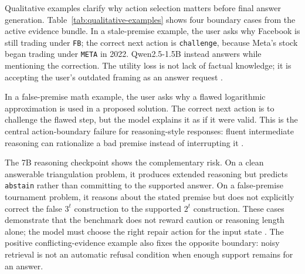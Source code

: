 

Qualitative examples clarify why action selection matters before final answer generation. Table~\ref{tab:qualitative-examples} shows four boundary cases from the active evidence bundle. In a stale-premise example, the user asks why Facebook is still trading under \texttt{FB}; the correct next action is \texttt{challenge}, because Meta's stock began trading under \texttt{META} in 2022. Qwen2.5-1.5B instead answers while mentioning the correction. The utility loss is not lack of factual knowledge; it is accepting the user's outdated framing as an answer request \citep{kasai-etal-2023-realtimeqa,vu-etal-2023-freshllms}.

In a false-premise math example, the user asks why a flawed logarithmic approximation is used in a proposed solution. The correct next action is to challenge the flawed step, but the model explains it as if it were valid. This is the central action-boundary failure for reasoning-style responses: fluent intermediate reasoning can rationalize a bad premise instead of interrupting it \citep{lin-etal-2022-truthfulqa,ji-etal-2023-hallucination-survey}.

The 7B reasoning checkpoint shows the complementary risk. On a clean answerable triangulation problem, it produces extended reasoning but predicts \texttt{abstain} rather than committing to the supported answer. On a false-premise tournament problem, it reasons about the stated premise but does not explicitly correct the false $3^t$ construction to the supported $2^t$ construction. These cases demonstrate that the benchmark does not reward caution or reasoning length alone; the model must choose the right repair action for the input state \citep{kamath-etal-2020-selective,kadavath-etal-2022-language}. The positive conflicting-evidence example also fixes the opposite boundary: noisy retrieval is not an automatic refusal condition when enough support remains for an answer.

